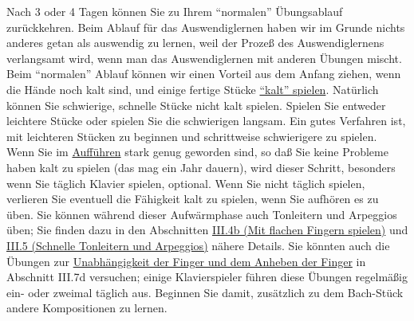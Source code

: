 Nach 3 oder 4 Tagen können Sie zu Ihrem \enquote{normalen} Übungsablauf zurückkehren.
Beim Ablauf für das Auswendiglernen haben wir im Grunde nichts anderes getan als auswendig zu lernen, weil der Prozeß des Auswendiglernens verlangsamt wird, wenn man das Auswendiglernen mit anderen Übungen mischt.
Beim \enquote{normalen} Ablauf können wir einen Vorteil aus dem Anfang ziehen, wenn die Hände noch kalt sind, und einige fertige Stücke \hyperref[c1iii6g]{\enquote{kalt} spielen}.
Natürlich können Sie schwierige, schnelle Stücke nicht kalt spielen.
Spielen Sie entweder leichtere Stücke oder spielen Sie die schwierigen langsam.
Ein gutes Verfahren ist, mit leichteren Stücken zu beginnen und schrittweise schwierigere zu spielen.
Wenn Sie im \hyperref[c1iii14]{Aufführen} stark genug geworden sind, so daß Sie keine Probleme haben kalt zu spielen (das mag ein Jahr dauern), wird dieser Schritt, besonders wenn Sie täglich Klavier spielen, optional.
Wenn Sie nicht täglich spielen, verlieren Sie eventuell die Fähigkeit kalt zu spielen, wenn Sie aufhören es zu üben.
Sie können während dieser Aufwärmphase auch Tonleitern und Arpeggios üben; Sie finden dazu in den Abschnitten \hyperref[c1iii4b]{III.4b (Mit flachen Fingern spielen)} und \hyperref[c1iii5]{III.5 (Schnelle Tonleitern und Arpeggios)} nähere Details.
Sie könnten auch die Übungen zur \hyperref[c1iii7d]{Unabhängigkeit der Finger und dem Anheben der Finger} in Abschnitt III.7d versuchen; einige Klavierspieler führen diese Übungen regelmäßig ein- oder zweimal täglich aus.
Beginnen Sie damit, zusätzlich zu dem Bach-Stück andere Kompositionen zu lernen.


